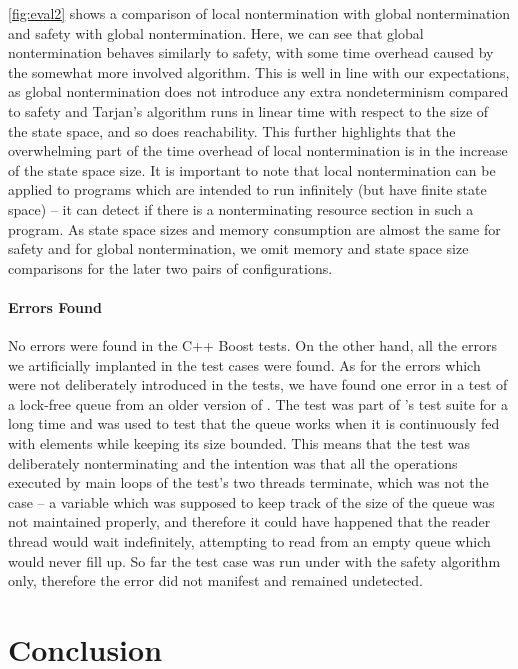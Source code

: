 \autoref{fig:eval2} shows a comparison of local nontermination with global nontermination and safety with global nontermination.
Here, we can see that global nontermination behaves similarly to safety, with some time overhead caused by the somewhat more involved algorithm.
This is well in line with our expectations, as global nontermination does not introduce any extra nondeterminism compared to safety and Tarjan's algorithm runs in linear time with respect to the size of the state space, and so does reachability.
This further highlights that the overwhelming part of the time overhead of local
nontermination is in the increase of the state space size.
It is important to note that local nontermination can be applied to programs
which are intended to run infinitely (but have finite state space) -- it can detect if there is a nonterminating resource section in such a program.
As state space sizes and memory consumption are almost the same for safety and for global nontermination, we omit memory and state space size comparisons for the later two pairs of configurations.

\paragraph{Errors Found}
No errors were found in the C++ Boost tests. On the other hand, all the errors
we artificially implanted in the test cases were found.  As for the errors which
were not deliberately introduced in the tests, we have found one error in a test
of a lock-free queue from an older version of \divine.  The test was part of
\divine's test suite for a long time and was used to test that the queue works
when it is continuously fed with elements while keeping its size bounded.  This
means that the test was deliberately nonterminating and the intention was that
all the operations executed by main loops of the test's two threads terminate,
which was not the case -- a variable which was supposed to keep track of the
size of the queue was not maintained properly, and therefore it could have happened
that the reader thread would wait indefinitely, attempting to read from an empty
queue which would never fill up. So far the test case was run under \divine with
the safety algorithm only, therefore the error did not manifest and remained
undetected.


\section{Conclusion} \label{sec:conclusion}


